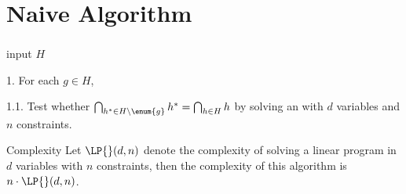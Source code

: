 \section{Naive Algorithm}
\begin{frame}\frametitle{\insertsection}\justifying
\begin{algo}[(Naive)]
\item[input] \(H\)
\item[1.] For each \(g \in H\),
\item[1.1.] Test whether \(\bigcap_{h^* \in H \setminus \enum{g}} h^* = \bigcap_{h \in H}
h\) by solving an \LP{} with \(d\) variables and \(n\) constraints.
\end{algo}
\pause
\begin{ebox}{Complexity}
	Let \(\LP{}(d,n)\) denote the complexity of solving a linear program in
	\(d\) variables with \(n\) constraints, then the complexity of this
	algorithm is \(n\cdot\LP{}(d,n)\).
\end{ebox}
\end{frame}
